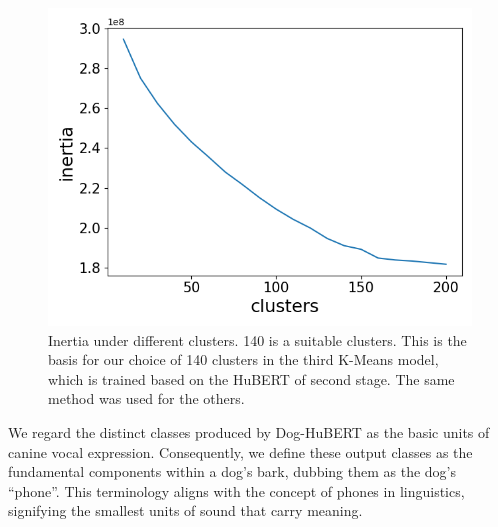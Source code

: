 \begin{figure}[h]
	\centering
	\includegraphics[width=0.95\columnwidth]{clusters.png}
	\caption{Inertia under different clusters. 140 is a suitable clusters. 
		This is the basis for our choice of 140 clusters in the third K-Means model, which is trained based on the HuBERT of second stage. 
		The same method was used for the others.}
	\label{fig:clusters}
\end{figure}

We regard the distinct classes produced by Dog-HuBERT as the basic units of canine vocal expression. Consequently, we define these output classes as the fundamental components within a dog's bark, dubbing them as the dog's ``phone''. This terminology aligns with the concept of phones in linguistics, signifying the smallest units of sound that carry meaning.


